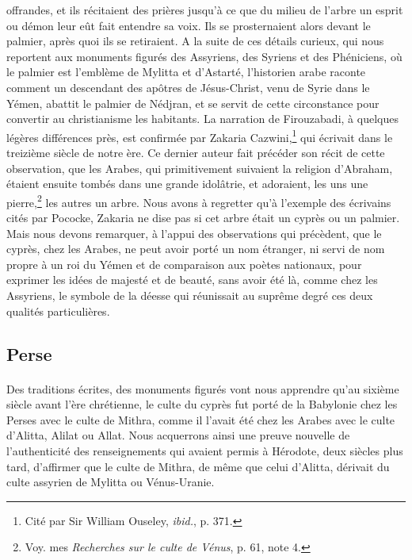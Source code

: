 \documentclass[a4paper, 11pt, oneside, polutonikogreek, french]{article}
\begin{document}
offrandes, et ils récitaient des prières jusqu'à ce que du milieu de l'arbre un esprit ou démon leur eût fait entendre sa voix. Ils se prosternaient alors devant le palmier, après quoi ils se retiraient. A la suite de ces détails curieux, qui nous reportent aux monuments figurés des Assyriens, des Syriens et des Phéniciens, où le palmier est l'emblème de Mylitta et d'Astarté, l'historien arabe raconte comment un descendant des apôtres de Jésus-Christ, venu de Syrie dans le Yémen, abattit le palmier de Nédjran, et se servit de cette circonstance pour convertir au christianisme les habitants. La narration de Firouzabadi, à quelques légères différences près, est confirmée par Zakaria Cazwini,\footnote{Cité par Sir William Ouseley, \emph{ibid.}, p. 371.} qui écrivait dans le treizième siècle de notre ère. Ce dernier auteur fait précéder son récit de cette observation, que les Arabes, qui primitivement suivaient la religion d'Abraham, étaient ensuite tombés dans une grande idolâtrie, et adoraient, les uns une pierre,\footnote{Voy. mes \emph{Recherches sur le culte de Vénus}, p. 61, note 4.} les autres un arbre. Nous avons à regretter qu'à l'exemple des écrivains cités par Pococke, Zakaria ne dise pas si cet arbre était un cyprès ou un palmier. Mais nous devons remarquer, à l'appui des observations qui précèdent, que le cyprès, chez les Arabes, ne peut avoir porté un nom étranger, ni servi de nom propre à un roi du Yémen et de comparaison aux poètes nationaux, pour exprimer les idées de majesté et de beauté, sans avoir été là, comme chez les Assyriens, le symbole de la déesse qui réunissait au suprême degré ces deux qualités particulières.

\clearpage
\subsection{Perse}
\paragraph{}
Des traditions écrites, des monuments figurés vont nous apprendre qu'au sixième siècle avant l'ère chrétienne, le culte du cyprès fut porté de la Babylonie chez les Perses avec le culte de Mithra, comme il l'avait été chez les Arabes avec le culte d'Alitta, Alilat ou Allat. Nous acquerrons ainsi une preuve nouvelle de l'authenticité des renseignements qui avaient permis à Hérodote, deux siècles plus tard, d'affirmer que le culte de Mithra, de même que celui d'Alitta, dérivait du culte assyrien de Mylitta ou Vénus-Uranie.
\end{document}
